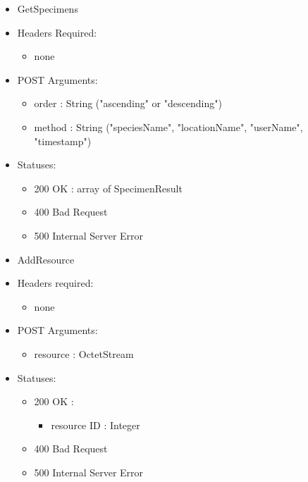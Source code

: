 \begin{itemize}
        \item GetSpecimens
        \item Headers Required:
        \begin{itemize}
        	\item none
        \end{itemize}
        \item POST Arguments:
        \begin{itemize}
            \item order : String ("ascending" or "descending")
            \item method : String ("speciesName", "locationName", "userName", "timestamp")
        \end{itemize}
        \item Statuses: 
        \begin{itemize}
        	\item 200 OK : array of SpecimenResult
        	\item 400 Bad Request
        	\item 500 Internal Server Error
        \end{itemize}

        \item AddResource
        \item Headers required: 
        \begin{itemize}
            \item none
        \end{itemize}
        \item POST Arguments:
        \begin{itemize}
        	\item resource : OctetStream
        \end{itemize}
        \item Statuses:
        \begin{itemize}
        	\item 200 OK :
            \begin{itemize}
        		\item resource ID : Integer
            \end{itemize}
        	\item 400 Bad Request
        	\item 500 Internal Server Error
        \end{itemize}


\end{itemize}
